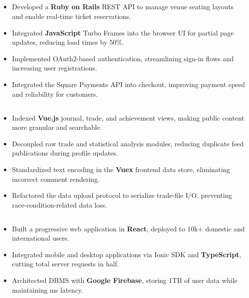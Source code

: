 \documentclass{article}
\newcommand{\subsubsectiontext}[1]{
    \hspace*{.5cm}%
    \begin{minipage}{.9\textwidth}%
    #1
    \end{minipage}%
}
\begin{document}
\subsection{}
\subsubsectiontext{
    \begin{itemize}
      \item Developed a \textbf{Ruby on Rails} REST API to manage venue seating layouts and enable real-time ticket reservations.
      \item Integrated \textbf{JavaScript} Turbo Frames into the browser UI for partial page updates, reducing load times by 50\%.
      \item Implemented OAuth2-based authentication, streamlining sign-in flows and increasing user registrations.
      \item Integrated the Square Payments API into checkout, improving payment speed and reliability for customers.
    \end{itemize}
}

\subsection{}
\subsubsectiontext{
    \begin{itemize}
        \item Indexed \textbf{Vue.js} journal, trade, and achievement views, making public content more granular and searchable.
        \item Decoupled raw trade and statistical analysis modules, reducing duplicate feed publications during profile updates.
        \item Standardized text encoding in the \textbf{Vuex} frontend data store, eliminating incorrect comment rendering.
        \item Refactored the data upload protocol to serialize trade-file I/O, preventing race-condition-related data loss.
    \end{itemize}
}

\subsection{}
\subsubsectiontext{
    \begin{itemize}
        \item Built a progressive web application in \textbf{React}, deployed to 10k+ domestic and international users.
        \item Integrated mobile and desktop applications via Ionic SDK and \textbf{TypeScript}, cutting total server requests in half.
        \item Architected DBMS with \textbf{Google Firebase}, storing 1TB of user data while maintaining ms latency.
    \end{itemize}
}
\end{document}
